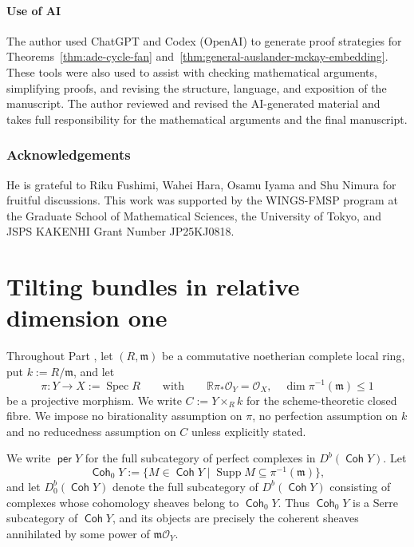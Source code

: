 \documentclass[a4paper,reqno]{amsart}
\def\O{\mathcal{O}}
\def\m{\mathfrak{m}}
\DeclareMathOperator{\Coh}{\mathsf{Coh}}
\DeclareMathOperator{\per}{\mathsf{per}}
\DeclareMathOperator{\Spec}{Spec}
\theoremstyle{definition}
\begin{document}
\subsection*{Use of AI}
The author used ChatGPT and Codex (OpenAI) to generate proof strategies for Theorems~\ref{thm:ade-cycle-fan} and~\ref{thm:general-auslander-mckay-embedding}. These tools were also used to assist with checking mathematical arguments, simplifying proofs, and revising the structure, language, and exposition of the manuscript. The author reviewed and revised the AI-generated material and takes full responsibility for the mathematical arguments and the final manuscript.

\section*{Acknowledgements}
He is grateful to Riku Fushimi, Wahei Hara, Osamu Iyama and Shu Nimura for fruitful discussions. This work was supported by the WINGS-FMSP program at the Graduate School of Mathematical Sciences, the University of Tokyo, and JSPS KAKENHI Grant Number JP25KJ0818.

\part{Tilting bundles in relative dimension one}\label{part:tilting bundles}

Throughout Part \ref{part:tilting bundles}, let $(R,\mathfrak{m})$ be a commutative noetherian complete local ring, put $k:=R/\m$, and let
\begin{equation}\label{eq:geometric-setup}
\pi\colon Y\longrightarrow X:=\Spec R
\qquad\text{with}\qquad
\mathbb{R}\pi_*\O_Y=\O_X,\quad \dim \pi^{-1}(\m)\le1
\end{equation}
be a projective morphism.
We write $C:=Y\times_Rk$ for the scheme-theoretic closed fibre. We impose no birationality assumption on $\pi$, no perfection assumption on $k$ and no reducedness assumption on $C$ unless explicitly stated.

We write $\per Y$ for the full subcategory of perfect complexes in $D^b(\Coh Y)$. Let
\[
\Coh_0Y:=\{M\in\Coh Y\mid\operatorname{Supp}M\subseteq \pi^{-1}(\m)\},
\]
and let $D^b_0(\Coh Y)$ denote the full subcategory of $D^b(\Coh Y)$ consisting of complexes whose cohomology sheaves belong to $\Coh_0Y$. Thus $\Coh_0Y$ is a Serre subcategory of $\Coh Y$, and its objects are precisely the coherent sheaves annihilated by some power of $\m\O_Y$.
\end{document}
